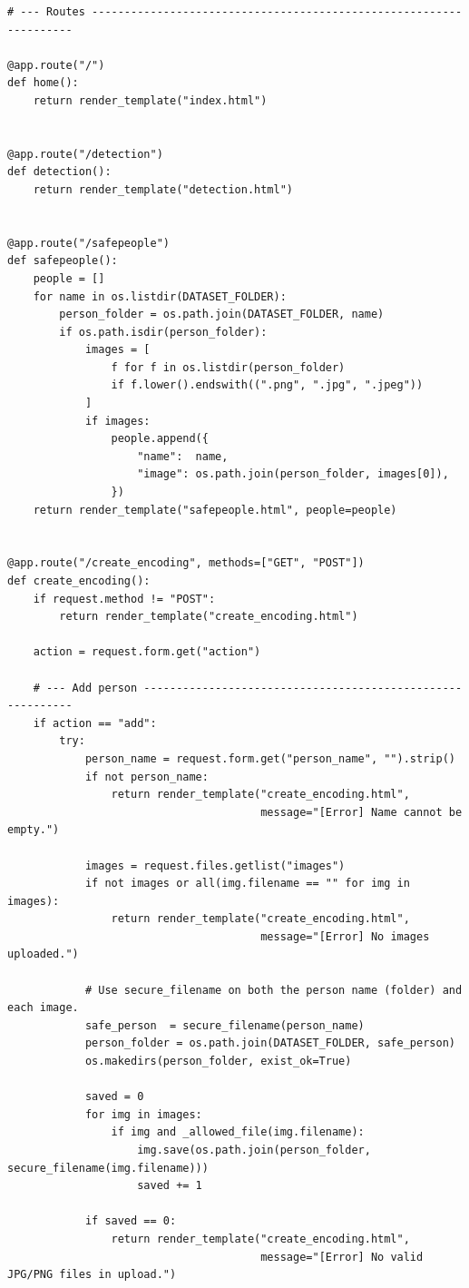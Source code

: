 \documentclass[12pt,a4paper]{report}
\begin{document}
\begin{lstlisting}
# --- Routes -------------------------------------------------------------------

@app.route("/")
def home():
    return render_template("index.html")


@app.route("/detection")
def detection():
    return render_template("detection.html")


@app.route("/safepeople")
def safepeople():
    people = []
    for name in os.listdir(DATASET_FOLDER):
        person_folder = os.path.join(DATASET_FOLDER, name)
        if os.path.isdir(person_folder):
            images = [
                f for f in os.listdir(person_folder)
                if f.lower().endswith((".png", ".jpg", ".jpeg"))
            ]
            if images:
                people.append({
                    "name":  name,
                    "image": os.path.join(person_folder, images[0]),
                })
    return render_template("safepeople.html", people=people)


@app.route("/create_encoding", methods=["GET", "POST"])
def create_encoding():
    if request.method != "POST":
        return render_template("create_encoding.html")

    action = request.form.get("action")

    # --- Add person -----------------------------------------------------------
    if action == "add":
        try:
            person_name = request.form.get("person_name", "").strip()
            if not person_name:
                return render_template("create_encoding.html",
                                       message="[Error] Name cannot be empty.")

            images = request.files.getlist("images")
            if not images or all(img.filename == "" for img in images):
                return render_template("create_encoding.html",
                                       message="[Error] No images uploaded.")

            # Use secure_filename on both the person name (folder) and each image.
            safe_person  = secure_filename(person_name)
            person_folder = os.path.join(DATASET_FOLDER, safe_person)
            os.makedirs(person_folder, exist_ok=True)

            saved = 0
            for img in images:
                if img and _allowed_file(img.filename):
                    img.save(os.path.join(person_folder, secure_filename(img.filename)))
                    saved += 1

            if saved == 0:
                return render_template("create_encoding.html",
                                       message="[Error] No valid JPG/PNG files in upload.")


\end{lstlisting}
\end{document}
